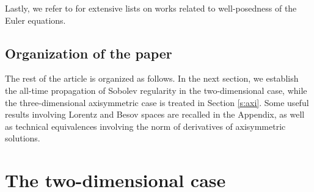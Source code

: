 \documentclass[11pt]{amsart}
\numberwithin{equation}{section}
\begin{document}
Lastly, we refer to \cite{BL1,El,SK} for extensive lists on works related to well-posedness of the Euler equations. 



\subsection*{Organization of the paper}
The rest of the article is organized as follows.
In the next section, we establish the all-time propagation of Sobolev regularity in the two-dimensional case,
while  the three-dimensional axisymmetric case is treated in Section \ref{s:axi}. 
Some useful results involving Lorentz and Besov spaces are recalled in the Appendix,  as well as 
technical equivalences involving the norm of derivatives of axisymmetric solutions. 








\section{The two-dimensional case}
\end{document}
